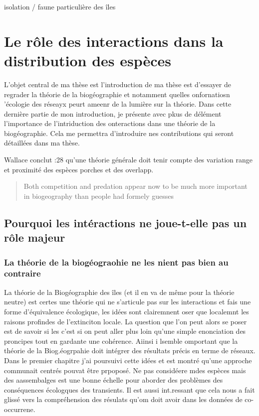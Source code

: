 isolation / faune particulière des îles

\section*{Le rôle des interactions dans la distribution des
espèces}\label{le-ruxf4le-des-interactions-dans-la-distribution-des-espuxe8ces}

L'objet central de ma thèse est l'introduction de ma thèse est d'essayer
de regrader la théorie de la biogéographie et notamment quelles
onfornatiosn 'écologie des réseayx peurt ameenr de la lumière sur la
théorie. Dans cette dernière partie de mon introduction, je présente
avec pkus de délément l'importance de l'intriduction des onteractions
dans une théorie de la biogéographie. Cela me permettra d'introduire nes
contributions qui seront détaillées dans ma thèse.

Wallace conclut :28 qu'une théorie générale doit tenir compte des
variation range et proximité des espèces porches et des overlapp.

\begin{quote}
Both competition and predation appear now to be much more important in
biogeography than people had formely guesses
\end{quote}

\subsection{Pourquoi les intéractions ne joue-t-elle pas un rôle
majeur}\label{pourquoi-les-intuxe9ractions-ne-joue-t-elle-pas-un-ruxf4le-majeur}

\subsubsection{La théorie de la biogéograohie ne les nient pas bien au
contraire}\label{la-thuxe9orie-de-la-bioguxe9ograohie-ne-les-nient-pas-bien-au-contraire}

La théorie de la Biogéographie des îles (et il en va de même pour la
théorie neutre) est certes une théorie qui ne s'articule pas sur les
interactions et fais une forme d'équivalence écologique, les idées sont
clairemnent oser que localemnt les raisons profindes de l'extinciton
locale. La question que l'on peut alors se poser est de savoir si les
c'est si on peut aller plus loin qu'une simple enonciation des proncipes
tout en gardante une cohérence. Aiinsi i lsemble omportant que la
théorie de la Biog.éogrpahie doit intégrer des résultats précis en terme
de réseaux. Dans le premier chapitre j'ai poursuivi cette idées et est
montré qu'une approche communait centrés pouvat être prpoposé. Ne pas
considéere mdes espèces mais des aassembalges est une bonne échelle pour
aborder des problèmes des conséquences écologques des transients. Il est
aussi int.ressant que cela nous a fait glissé vers la compréhension des
résulats qu'om doit avoir dans les données de co-occurrene.

